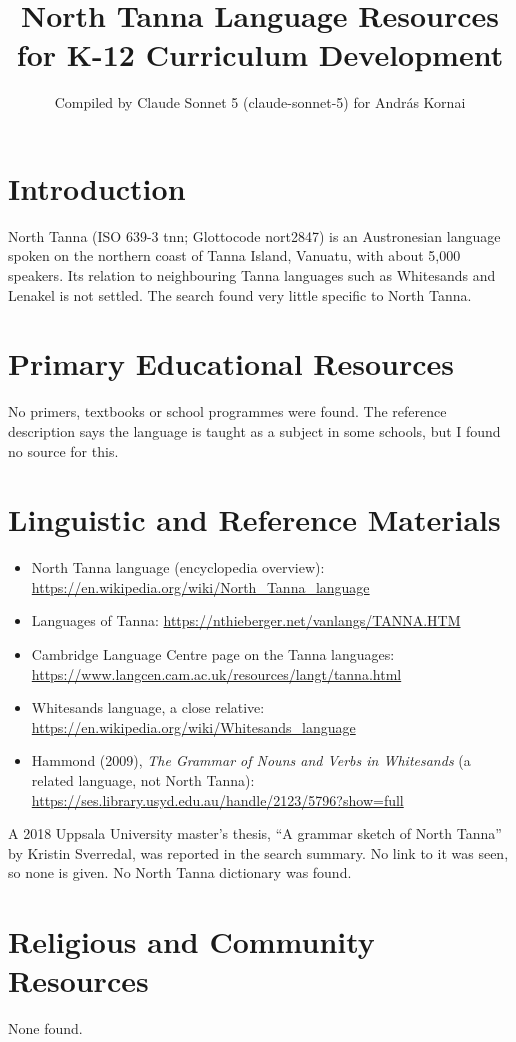 \documentclass[12pt]{article}
\title{North Tanna Language Resources for K-12 Curriculum Development}
\author{Compiled by Claude Sonnet 5 (claude-sonnet-5) for Andr\'as Kornai}
\date{}
\begin{document}
\maketitle

\section{Introduction}
North Tanna (ISO 639-3 tnn; Glottocode nort2847) is an Austronesian language spoken on the northern coast of Tanna Island, Vanuatu, with about 5,000 speakers. Its relation to neighbouring Tanna languages such as Whitesands and Lenakel is not settled. The search found very little specific to North Tanna.

\section{Primary Educational Resources}
No primers, textbooks or school programmes were found. The reference description says the language is taught as a subject in some schools, but I found no source for this.

\section{Linguistic and Reference Materials}
\begin{itemize}
\item North Tanna language (encyclopedia overview): \url{https://en.wikipedia.org/wiki/North_Tanna_language}
\item Languages of Tanna: \url{https://nthieberger.net/vanlangs/TANNA.HTM}
\item Cambridge Language Centre page on the Tanna languages: \url{https://www.langcen.cam.ac.uk/resources/langt/tanna.html}
\item Whitesands language, a close relative: \url{https://en.wikipedia.org/wiki/Whitesands_language}
\item Hammond (2009), \emph{The Grammar of Nouns and Verbs in Whitesands} (a related language, not North Tanna): \url{https://ses.library.usyd.edu.au/handle/2123/5796?show=full}
\end{itemize}
A 2018 Uppsala University master's thesis, ``A grammar sketch of North Tanna'' by Kristin Sverredal, was reported in the search summary. No link to it was seen, so none is given. No North Tanna dictionary was found.

\section{Religious and Community Resources}
None found.
\end{document}
